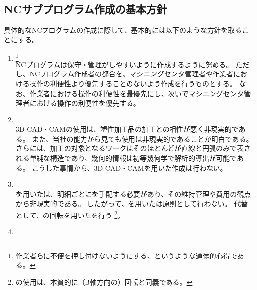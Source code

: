 \clearpage


\subsection{NCサブプログラム作成の基本方針}
具体的なNCプログラムの作成に際して、基本的には以下のような方針を取ることにする。
\begin{enumerate}[label*=\alph*)]
\item {}
\footnote{作業者らに不便を押し付けないようにする、というような道徳的心得である。}\\
NCプログラムは保守・管理がしやすいように作成するように努める。
ただし、NCプログラム作成者の都合を、マシニングセンタ管理者や作業者における操作の利便性より優先することのないよう作成を行うものとする。
なお、作業者における操作の利便性を最優先にし、次いでマシニングセンタ管理者における操作の利便性を優先する。
\item {}\\
3D CAD・CAMの使用は、塑性加工品の加工との相性が悪く非現実的である。
また、当社の能力から見ても使用は非現実的であることが明白である。
さらには、加工の対象となるワークはそのほとんどが直線と円弧のみで表される単純な構造であり、幾何的情報は初等幾何学で解析的導出が可能である。
こうした事情から、3D CAD・CAMを用いた作成は行わない。
\item {}\\
\Spacer を用いた\AlocationAdjustment は、明細ごとに\Spacer を手配する必要があり、その維持管理や費用の観点から非現実的である。
したがって、\Spacer を用いた\AlocationAdjustment は原則として行わない。
代替として、\Table の回転を用いた\AlocationAdjustment を行う
\footnote{\Spacer の使用は、本質的に（B軸方向の）回転と同義である。}。
\item {}\\

\end{enumerate}
